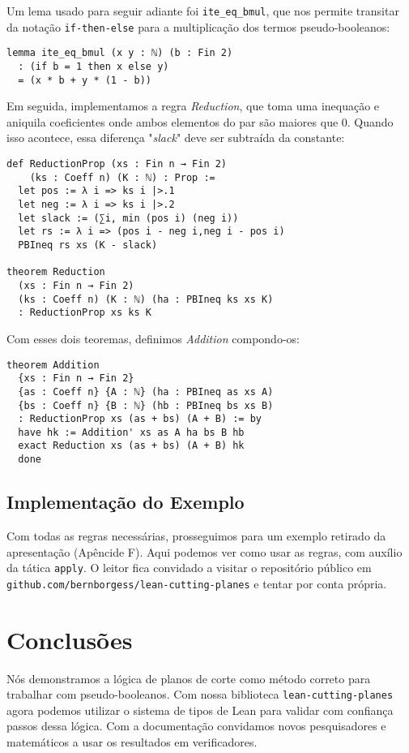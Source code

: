 \documentclass[conference]{IEEEtran}
\begin{document}
Um lema usado para seguir adiante foi \texttt{ite\_eq\_bmul},
que nos permite transitar da notação \texttt{if-then-else}
para a multiplicação dos termos pseudo-booleanos:

\begin{verbatim}
lemma ite_eq_bmul (x y : ℕ) (b : Fin 2)
  : (if b = 1 then x else y)
  = (x * b + y * (1 - b))
\end{verbatim}

Em seguida, implementamos a regra \textit{Reduction}, que toma uma inequação e aniquila coeficientes
onde ambos elementos do par são maiores que $0$.
Quando isso acontece, essa diferença "\textit{slack}" deve ser subtraída da constante:

\begin{verbatim}
def ReductionProp (xs : Fin n → Fin 2)
    (ks : Coeff n) (K : ℕ) : Prop :=
  let pos := λ i => ks i |>.1
  let neg := λ i => ks i |>.2
  let slack := (∑i, min (pos i) (neg i))
  let rs := λ i => (pos i - neg i,neg i - pos i)
  PBIneq rs xs (K - slack)

theorem Reduction
  (xs : Fin n → Fin 2)
  (ks : Coeff n) (K : ℕ) (ha : PBIneq ks xs K)
  : ReductionProp xs ks K
\end{verbatim}

Com esses dois teoremas, definimos \textit{Addition} compondo-os:

\begin{verbatim}
theorem Addition
  {xs : Fin n → Fin 2}
  {as : Coeff n} {A : ℕ} (ha : PBIneq as xs A)
  {bs : Coeff n} {B : ℕ} (hb : PBIneq bs xs B)
  : ReductionProp xs (as + bs) (A + B) := by
  have hk := Addition' xs as A ha bs B hb
  exact Reduction xs (as + bs) (A + B) hk
  done
\end{verbatim}

\subsection{Implementação do Exemplo}
Com todas as regras necessárias, prosseguimos para um exemplo retirado da apresentação
(Apêncide F). Aqui podemos ver como usar as regras, com auxílio da tática \texttt{apply}.
O leitor fica convidado a visitar o repositório público em \texttt{github.com/bernborgess/lean-cutting-planes}
e tentar por conta própria.


\section*{Conclusões}
Nós demonstramos a lógica de planos de corte como método correto para trabalhar com pseudo-booleanos.
Com nossa biblioteca \texttt{lean-cutting-planes} agora podemos utilizar o sistema de tipos de Lean
para validar com confiança passos dessa lógica. Com a documentação convidamos novos pesquisadores e
matemáticos a usar os resultados em verificadores.
\end{document}
